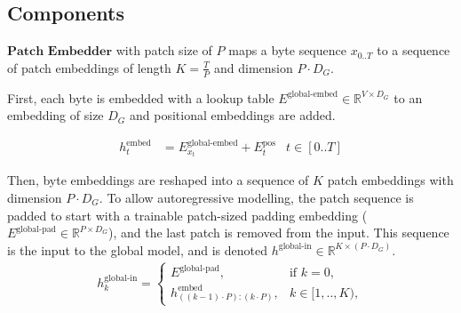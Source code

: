 \documentclass{article}
\newcommand{\h}[1]{h^\text{#1}}%
\newcommand{\inR}[1]{\in\mathbb{R}^{#1}}
\newcommand{\mike}[1]{\textcolor{blue}{[Mike: #1]}}
\theoremstyle{plain}
\theoremstyle{definition}
\theoremstyle{remark}
\begin{document}
\subsection{Components}
$\textbf{Patch Embedder}$ with patch size of $P$ maps a byte sequence $x_{0..T}$ to a sequence of patch embeddings  %
of length $K=\frac{T}{P}$ and dimension $P\cdot D_G$. 

First, each byte is embedded with a lookup table $E^{\text{global-embed}}\inR{V \times D_G}$ to an embedding of size $D_G$ and positional embeddings are added. 

\begin{align}
\h{embed}_{t}&= E^\text{global-embed}_{x_t}+E^\text{pos}_t & t\in [0..T]
\end{align}

Then, byte embeddings are reshaped into a sequence of $K$ patch embeddings with dimension $P\cdot D_G$.
To allow autoregressive modelling, the patch sequence is padded to start with a trainable patch-sized padding embedding ($E^{\text{global-pad}} \inR{P\times D_G} $), and the last patch is removed from the input. This sequence is the input to the global model, and is denoted $\h{global-in}\inR{K\times (P\cdot D_G)}$. 
\begin{align}
\h{global-in}_{k} = 
\begin{cases}
E^{\text{global-pad}} , & \text{if } k = 0, \\
\h{embed}_{((k-1)\cdot P):(k \cdot P)}, & k\in [1,..,K),
\end{cases}
\end{align}

\end{document}
